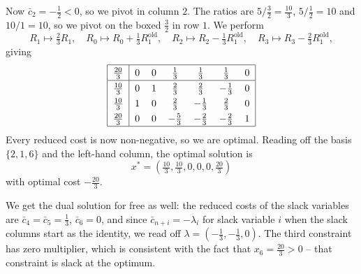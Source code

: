 \documentclass[a4paper]{scrartcl}
\begin{document}
\begin{example}
    Now $\bar c_2 = -\frac12 < 0$, so we pivot in column $2$. The ratios are $5/\frac32 = \frac{10}{3}$, $5/\frac12 = 10$ and $10/1 = 10$, so we pivot on the boxed $\frac32$ in row $1$. We perform
    $$
    R_1 \mapsto \tfrac23 R_1, \quad R_0 \mapsto R_0 + \tfrac13 R_1^{\text{old}}, \quad R_2 \mapsto R_2 - \tfrac13 R_1^{\text{old}}, \quad R_3 \mapsto R_3 - \tfrac23 R_1^{\text{old}},
    $$
    giving
    $$
    \arraycolsep=6pt\def\arraystretch{1.3}
    \begin{array}{|c|cccccc|}\hline
        \frac{20}{3} & 0 & 0 & \frac13 & \frac13 & \frac13 & 0\\\hline
        \frac{10}{3} & 0 & 1 & \frac23 & \frac23 & -\frac13 & 0\\
        \frac{10}{3} & 1 & 0 & \frac23 & -\frac13 & \frac23 & 0\\
        \frac{20}{3} & 0 & 0 & -\frac53 & -\frac23 & -\frac23 & 1\\\hline
    \end{array}
    $$
    Every reduced cost is now non-negative, so we are optimal. Reading off the basis $\{2,1,6\}$ and the left-hand column, the optimal solution is
    $$
    x^* = \left(\tfrac{10}{3}, \tfrac{10}{3}, 0, 0, 0, \tfrac{20}{3}\right)
    $$
    with optimal cost $-\frac{20}{3}$.

    We get the dual solution for free as well: the reduced costs of the slack variables are $\bar c_4 = \bar c_5 = \frac13$, $\bar c_6 = 0$, and since $\bar c_{n+i} = -\lambda_i$ for slack variable $i$ when the slack columns start as the identity, we read off $\lambda = (-\frac13, -\frac13, 0)$. The third constraint has zero multiplier, which is consistent with the fact that $x_6 = \frac{20}3 > 0$ -- that constraint is slack at the optimum.
\end{example}
\end{document}
